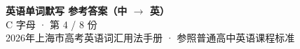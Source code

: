 \documentclass[10pt,a4paper]{article}
\begin{document}
\pagestyle{plain}

\begin{center}
{\LARGE\bfseries 英语单词默写 \quad 参考答案（中 $\to$ 英）}\\[0.22em]
{\large C 字母 · 第 4 / 8 份}\\[0.18em]
{\small 2026年上海市高考英语词汇用法手册 · 参照普通高中英语课程标准}
\end{center}

\vspace{0.2em}
\noindent{\color{rulegray}\rule{\textwidth}{0.8pt}}

\vspace{0.35em}

\vspace{0.25em}
\renewcommand{\arraystretch}{1.32}
\end{document}
